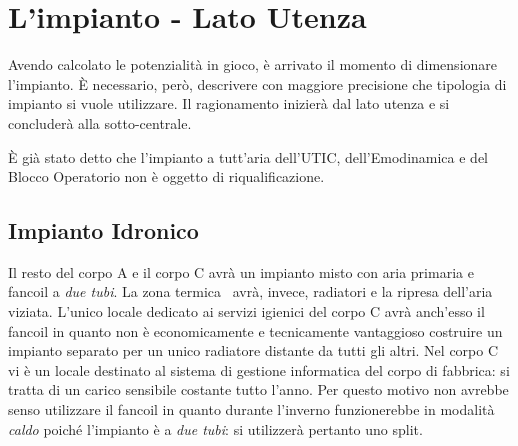 \section{L'impianto - Lato Utenza}
Avendo calcolato le potenzialità in gioco, è arrivato il momento di dimensionare l'impianto. È necessario, però, descrivere con maggiore precisione che tipologia di impianto si vuole utilizzare. Il ragionamento inizierà dal lato utenza e si concluderà alla sotto-centrale.

È già stato detto che l'impianto a tutt'aria dell'UTIC, dell'Emodinamica e del Blocco Operatorio non è oggetto di riqualificazione. 
\subsection{Impianto Idronico}
Il resto del corpo A e il corpo C avrà un impianto misto con aria primaria e fancoil a \emph{due tubi}. La zona termica \radd\ avrà, invece, radiatori e la ripresa dell'aria viziata. L'unico locale dedicato ai servizi igienici del corpo C avrà anch'esso il fancoil in quanto non è economicamente e tecnicamente vantaggioso costruire un impianto separato per un unico radiatore distante da tutti gli altri. Nel corpo C vi è un locale destinato al sistema di gestione informatica del corpo di fabbrica: si tratta di un carico sensibile costante tutto l'anno. Per questo motivo non avrebbe senso utilizzare il fancoil in quanto durante l'inverno funzionerebbe in modalità \emph{caldo} poiché l'impianto è a \emph{due tubi}: si utilizzerà pertanto uno split. 

